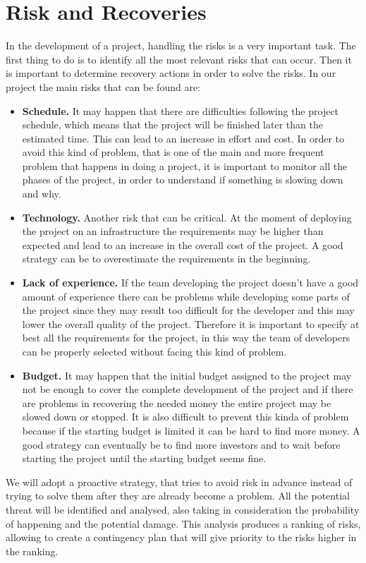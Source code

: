 \section{Risk and Recoveries}
In the development of a project, handling the risks is a very important task. The first thing to do is to identify all
the most relevant risks that can occur. Then it is important to determine recovery actions in order to solve the risks.
In our project the main risks that can be found are:
\begin{itemize}
  \item \textbf{Schedule.} It may happen that there are difficulties following the project schedule, which means that the project will be finished later
  than the estimated time. This can lead to an increase in effort and cost.
  In order to avoid this kind of problem, that is one of the main and more frequent problem that happens in doing a project, it is important to monitor all the phases of the project,
  in order to understand if something is slowing down and why.
  \item \textbf{Technology.} Another risk that can be critical. At the moment of deploying the project on an infrastructure the requirements may be higher than expected
  and lead to an increase in the overall cost of the project.
  A good strategy can be to overestimate the requirements in the beginning.
  \item \textbf{Lack of experience.} If the team developing the project doesn't have a good amount of experience there can be problems while developing some parts of the project since
  they may result too difficult for the developer and this may lower the overall quality of the project.
  Therefore it is important to specify at best all the requirements for the project, in this way the team of developers can be properly selected without facing this kind of problem.
  \item \textbf{Budget.} It may happen that the initial budget assigned to the project may not be enough to cover the complete development of the project and if there are problems in recovering
  the needed money the entire project may be slowed down or stopped.
  It is also difficult to prevent this kinda of problem because if the starting budget is limited it can be hard to find more money. A good strategy can eventually be to find more investors and to
  wait before starting the project until the starting budget seems fine.
\end{itemize}

We will adopt a proactive strategy, that tries to avoid risk in advance instead of trying to solve them after they are already become a problem. All the potential threat will be
identified and analysed, also taking in consideration the probability of happening and the potential damage. This analysis produces a ranking of risks, allowing to create a contingency plan
that will give priority to the risks higher in the ranking. 
